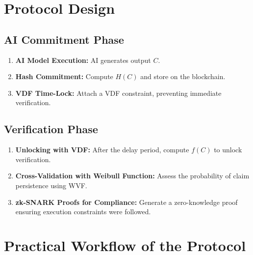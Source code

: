 \documentclass[12pt]{report}
\begin{document}
\section{Protocol Design}

\subsection{AI Commitment Phase}
\begin{enumerate}
    \item \textbf{AI Model Execution:} AI generates output \( C \).
    \item \textbf{Hash Commitment:} Compute \( H(C) \) and store on the blockchain.
    \item \textbf{VDF Time-Lock:} Attach a VDF constraint, preventing immediate verification.
\end{enumerate}

\subsection{Verification Phase}
\begin{enumerate}
    \item \textbf{Unlocking with VDF:} After the delay period, compute \( f(C) \) to unlock verification.
    \item \textbf{Cross-Validation with Weibull Function:} Assess the probability of claim persistence using WVF.
    \item \textbf{zk-SNARK Proofs for Compliance:} Generate a zero-knowledge proof ensuring execution constraints were followed.
\end{enumerate}

\section{Practical Workflow of the Protocol}
\end{document}

